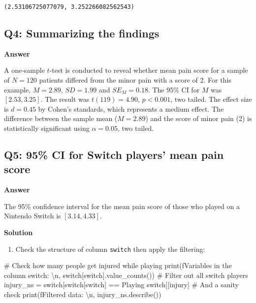 \documentclass[
  a4paper,
  DIV=11,
  numbers=noendperiod]{scrartcl}
\newenvironment{Shaded}{\begin{snugshade}}{\end{snugshade}}
\newcommand{\BuiltInTok}[1]{\textcolor[rgb]{0.00,0.23,0.31}{#1}}
\newcommand{\CharTok}[1]{\textcolor[rgb]{0.13,0.47,0.30}{#1}}
\newcommand{\CommentTok}[1]{\textcolor[rgb]{0.37,0.37,0.37}{#1}}
\newcommand{\NormalTok}[1]{\textcolor[rgb]{0.00,0.23,0.31}{#1}}
\newcommand{\OperatorTok}[1]{\textcolor[rgb]{0.37,0.37,0.37}{#1}}
\newcommand{\SpecialStringTok}[1]{\textcolor[rgb]{0.13,0.47,0.30}{#1}}
\newcommand{\StringTok}[1]{\textcolor[rgb]{0.13,0.47,0.30}{#1}}
\providecommand{\tightlist}{%
  \setlength{\itemsep}{0pt}\setlength{\parskip}{0pt}}\usepackage{longtable,booktabs,array}
\begin{document}
\begin{verbatim}
(2.53106725077079, 3.252266082562543)
\end{verbatim}

\subsection{Q4: Summarizing the
findings}\label{q4-summarizing-the-findings}

\textbf{Answer}

A one‐sample \(t\)-test is conducted to reveal whether mean pain score
for a sample of \(N = 120\) patients differed from the minor pain with a
score of 2. For this example, \(M = 2.89\), \(SD = 1.99\) and
\(SE_M = 0.18\). The 95\% CI for \(M\) was \([2.53, 3.25]\). The result
was \(t(119) = 4.90\), \(p < 0.001\), two tailed. The effect size is
\(d = 0.45\) by Cohen's standards, which represents a medium effect. The
difference between the sample mean (\(M = 2.89\)) and the score of minor
pain (2) is statistically significant using \(\alpha = 0.05\), two
tailed.

\subsection{Q5: 95\% CI for Switch players' mean pain
score}\label{q5-95-ci-for-switch-players-mean-pain-score}

\textbf{Answer}

The 95\% confidence interval for the mean pain score of those who played
on a Nintendo Switch is \([3.14, 4.33]\).

\textbf{Solution}

\begin{enumerate}
\def\labelenumi{\arabic{enumi}.}
\tightlist
\item
  Check the structure of column \texttt{switch} then apply the
  filtering:
\end{enumerate}

\begin{Shaded}
\begin{Highlighting}[numbers=left,,]
\CommentTok{\# Check how many people get injured while playing}
\BuiltInTok{print}\NormalTok{(}\SpecialStringTok{f\textquotesingle{}Variables in the column switch: }\CharTok{\textbackslash{}n}\SpecialStringTok{\textquotesingle{}}\NormalTok{, switch[}\StringTok{\textquotesingle{}switch\textquotesingle{}}\NormalTok{].value\_counts())}
\CommentTok{\# Filter out all switch players}
\NormalTok{injury\_ns }\OperatorTok{=}\NormalTok{ switch[switch[}\StringTok{\textquotesingle{}switch\textquotesingle{}}\NormalTok{] }\OperatorTok{==} \StringTok{\textquotesingle{}Playing switch\textquotesingle{}}\NormalTok{][}\StringTok{\textquotesingle{}injury\textquotesingle{}}\NormalTok{]}
\CommentTok{\# And a sanity check}
\BuiltInTok{print}\NormalTok{(}\SpecialStringTok{f\textquotesingle{}Filtered data: }\CharTok{\textbackslash{}n}\SpecialStringTok{\textquotesingle{}}\NormalTok{, injury\_ns.describe())}
\end{Highlighting}
\end{Shaded}
\end{document}

